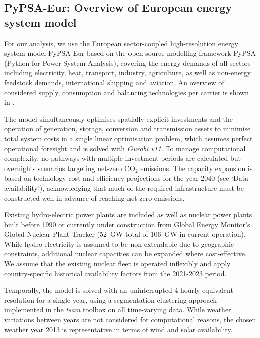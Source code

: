 

\subsection*{PyPSA-Eur: Overview of European energy system model}

For our analysis, we use the European sector-coupled high-resolution energy
system model PyPSA-Eur\cite{horschPyPSAEurOpen2018a} based on the open-source
modelling framework PyPSA\cite{brownPyPSAPython2018} (Python for Power System
Analysis), covering the energy demands of all sectors including electricity,
heat, transport, industry, agriculture, as well as non-energy feedstock demands,
international shipping and aviation. An overview of considered supply,
consumption and balancing technologies per carrier is shown in
.

The model simultaneously optimises spatially explicit investments and the
operation of generation, storage, conversion and transmission assets to minimise
total system costs in a single linear optimisation problem, which assumes
perfect operational foresight and is solved with \textit{Gurobi
v11}.\cite{gurobi} To manage computational complexity, no pathways with multiple
investment periods are calculated but overnights scenarios targeting net-zero
CO$_2$ emissions. The capacity expansion is based on technology cost and
efficiency projections for the year 2040 (see `Data availability'),
acknowledging that much of the required infrastructure must be constructed well
in advance of reaching net-zero emissions.

Existing hydro-electric power plants\cite{gotzensPerformingEnergy2019} are
included as well as nuclear power plants built before 1990 or currently under
construction from Global Energy Monitor's Global Nuclear Plant Tracker (52~GW
total of 106~GW in current
operation).\cite{globalenergymonitorGlobalNuclearPower2024} While
hydro-electricity is assumed to be non-extendable due to geographic constraints,
additional nuclear capacities can be expanded where cost-effective. We assume
that the existing nuclear fleet is operated inflexibly and apply
country-specific historical availability factors from the 2021-2023
period.\cite{internationalatomicenergyagencyPowerReactorInformation2024}

Temporally, the model is solved with an uninterrupted 4-hourly equivalent
resolution for a single year, using a segmentation clustering approach
implemented in the \textit{tsam} toolbox on all time-varying
data.\cite{hoffmannParetooptimalTemporal2022} While weather variations between
years are not considered for computational reasons, the chosen weather year 2013
is representative in terms of wind and solar
availability.\cite{gotskeDesigningSectorcoupledEuropean2024}

